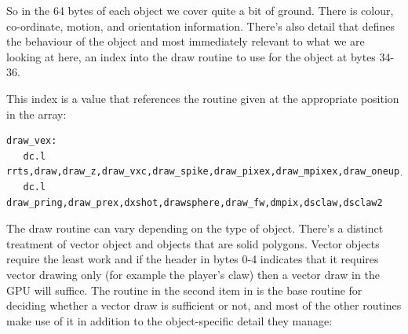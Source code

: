 So in the 64 bytes of each object we cover quite a bit of ground. There is colour, co-ordinate, motion, and orientation
information. There's also detail that defines the behaviour of the object and most immediately relevant to what
we are looking at here, an index into the draw routine to use for the object at bytes 34-36.

This index is a value that references the routine given at the appropriate position in the  array:
\begin{lstlisting}
draw_vex: 
   dc.l rrts,draw,draw_z,draw_vxc,draw_spike,draw_pixex,draw_mpixex,draw_oneup,draw_pel,changex
   dc.l draw_pring,draw_prex,dxshot,drawsphere,draw_fw,dmpix,dsclaw,dsclaw2
\end{lstlisting}

The draw routine can vary depending on the type of object. There's a distinct treatment of vector object and objects
that are solid polygons. Vector objects require the least work and if the header in bytes 0-4 indicates that it requires
vector drawing only (for example the player's claw) then a vector draw in the GPU will suffice. The  routine
in the second item in  is the base routine for deciding whether a vector draw is sufficient or not, and
most of the other routines make use of it in addition to the object-specific detail they manage:

